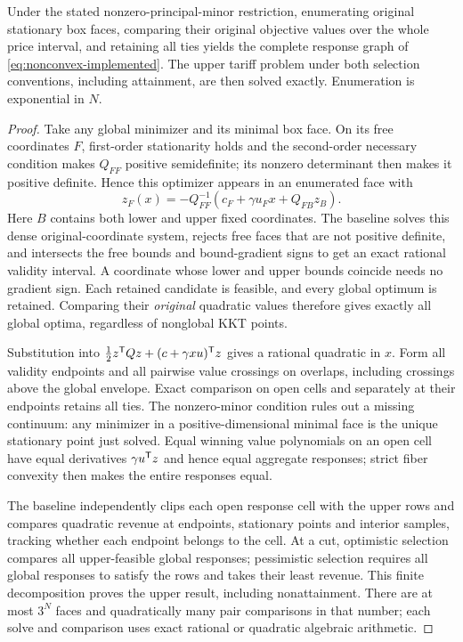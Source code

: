 \begin{proposition}
\label{prop:original-face-baseline}
Under the stated nonzero-principal-minor restriction, enumerating original
stationary box faces, comparing their original objective values over the
whole price interval, and retaining all ties yields the complete response
graph of \eqref{eq:nonconvex-implemented}. The upper tariff problem under both selection conventions, including
attainment, are then solved exactly. Enumeration is exponential in $N$.
\end{proposition}
\begin{proof}
Take any global minimizer and its minimal box face. On its free coordinates
$F$, first-order stationarity holds and the second-order necessary condition
makes $Q_{FF}$ positive semidefinite; its nonzero determinant then makes
it positive definite. Hence this optimizer appears in an enumerated face with
\[
 z_F(x)=-Q_{FF}^{-1}(c_F+\gamma u_Fx+Q_{FB}z_B).
\]
Here $B$ contains both lower and upper fixed coordinates. The baseline
solves this dense original-coordinate system, rejects free faces that are not
positive definite, and intersects the free bounds and bound-gradient signs to
get an exact rational validity interval. A coordinate whose lower and upper
bounds coincide needs no gradient sign. Each retained candidate is feasible,
and every global optimum is retained. Comparing their \emph{original} quadratic
values therefore gives exactly all global optima, regardless of nonglobal KKT
points.

Substitution into $\tfrac12z^{\mathsf T} Qz+(c+\gamma xu)^{\mathsf T} z$ gives a rational
quadratic in $x$. Form all validity endpoints and all pairwise value crossings
on overlaps, including crossings above the global envelope. Exact comparison
on open cells and separately at their endpoints retains all ties. The
nonzero-minor condition rules out a missing continuum: any minimizer in a
positive-dimensional minimal face is the unique stationary point just solved.
Equal winning value polynomials on an open cell have equal derivatives
$\gamma u^{\mathsf T} z$ and hence equal aggregate responses; strict fiber convexity
then makes the entire responses equal.

The baseline independently clips each open response cell with the upper rows
and compares quadratic revenue at endpoints, stationary points and interior
samples, tracking whether each endpoint belongs to the cell. At a cut,
optimistic selection compares all upper-feasible global responses; pessimistic
selection requires all global responses to satisfy the rows and takes their
least revenue. This finite decomposition proves the upper result, including
nonattainment. There are at most $3^N$ faces and quadratically many pair
comparisons in that number; each solve and comparison uses exact rational or
quadratic algebraic arithmetic.
\end{proof}

